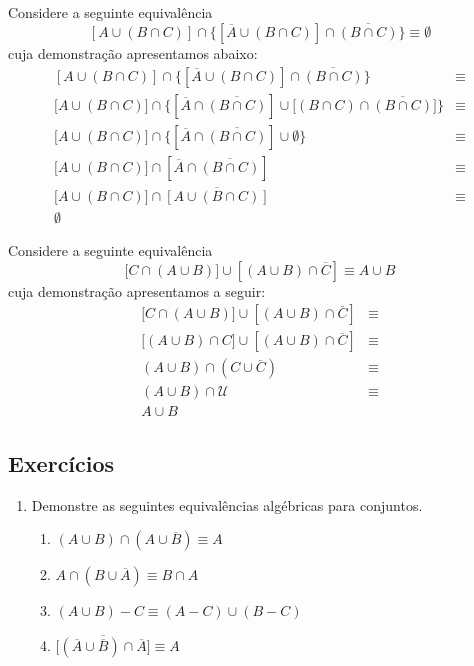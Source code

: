 \begin{Example}
Considere a seguinte equivalência
\[
[A \cup (B\cap C)]\cap\{[\overline{A}\cup(B\cap C)]\cap \overline{(B\cap C)}\} \equiv \emptyset
\]
cuja demonstração apresentamos abaixo:
\[
\begin{array}{lc}
[A\cup (B\cap C)]\cap\{[\overline{A}\cup (B\cap
C)]\cap\overline{(B\cap C)}\} &\equiv \\
\lbrack A\cup (B\cap C) \rbrack \cap\{[\overline{A}\cap \overline{(B\cap
C)}]\cup\lbrack (B\cap C) \cap \overline{(B\cap C)}\rbrack\} & \equiv \\
\lbrack A\cup (B\cap C) \rbrack \cap\{[\overline{A}\cap \overline{(B\cap
C)}]\cup\emptyset\} & \equiv \\
\lbrack A\cup (B\cap C) \rbrack \cap[\overline{A}\cap \overline{(B\cap
C)}] & \equiv \\
\lbrack A\cup (B\cap C) \rbrack \cap \overline{[A\cup (B\cap
C)]} & \equiv \\
\emptyset
\end{array}
\]
\end{Example}
\begin{Example}
Considere a seguinte equivalência
\[
\lbrack C \cap (A\cup B) \rbrack \cup [(A\cup B)\cap \overline{C}]
\equiv A \cup B
\]
cuja demonstração apresentamos a seguir:
\[
\begin{array}{lc}
\lbrack C \cap (A\cup B) \rbrack \cup [(A\cup B)\cap \overline{C}] &
\equiv \\
\lbrack (A\cup B) \cap C \rbrack \cup [(A\cup B)\cap \overline{C}] &
\equiv \\
(A\cup B)\cap (C \cup \overline{C}) & \equiv\\
(A\cup B)\cap \mathcal{U} & \equiv\\
A\cup B
\end{array}
\]
\end{Example}

\subsection{Exercícios}

\begin{enumerate}
  \item Demonstre as seguintes equivalências algébricas para
    conjuntos.
  \begin{enumerate}
      \item $(A \cup B) \cap (A \cup \overline{B}) \equiv A$
      \item $A \cap (B \cup \overline{A}) \equiv B\cap A$
      \item $(A \cup B) - C \equiv (A - C) \cup (B - C)$
      \item $\overline{\lbrack (\overline{A} \cup \overline{B}) \cap
          \overline{A}\rbrack}  \equiv A$
  \end{enumerate}
\end{enumerate}

